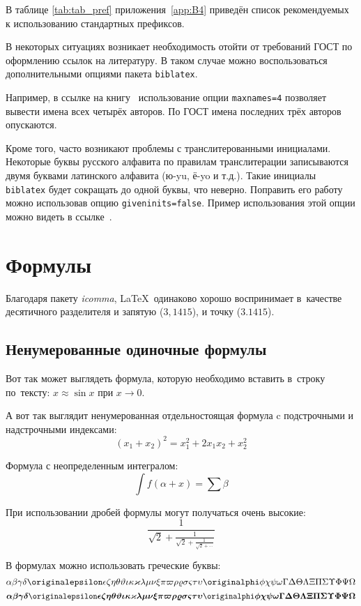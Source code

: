 В таблице \cref{tab:tab_pref} приложения~\cref{app:B4} приведён список рекомендуемых
к использованию стандартных префиксов.

В некоторых ситуациях возникает необходимость отойти от требований ГОСТ по оформлению ссылок на
литературу.
В таком случае можно воспользоваться дополнительными опциями пакета \verb+biblatex+.

Например, в ссылке на книгу~\cite{sobenin_kdv} использование опции \verb+maxnames=4+ позволяет
вывести имена всех четырёх авторов.
По ГОСТ имена последних трёх авторов опускаются.

Кроме того, часто возникают проблемы с транслитерованными инициалами. Некоторые буквы русского
алфавита по правилам транслитерации записываются двумя буквами латинского алфавита (ю-yu, ё-yo и
т.д.).
Такие инициалы \verb+biblatex+ будет сокращать до одной буквы, что неверно.
Поправить его работу можно использовав опцию \verb+giveninits=false+.
Пример использования этой опции можно видеть в ссылке~\cite{initials}.

\section{Формулы}\label{sec:ch1/sec3}

Благодаря пакету \textit{icomma}, \LaTeX~одинаково хорошо воспринимает
в~качестве десятичного разделителя и запятую (\(3,1415\)), и точку (\(3.1415\)).

\subsection{Ненумерованные одиночные формулы}\label{subsec:ch1/sec3/sub1}

Вот так может выглядеть формула, которую необходимо вставить в~строку
по~тексту: \(x \approx \sin x\) при \(x \to 0\).

А вот так выглядит ненумерованная отдельностоящая формула c подстрочными
и надстрочными индексами:
\[
    (x_1+x_2)^2 = x_1^2 + 2 x_1 x_2 + x_2^2
\]

Формула с неопределенным интегралом:
\[
    \int f(\alpha+x)=\sum\beta
\]

При использовании дробей формулы могут получаться очень высокие:
\[
    \frac{1}{\sqrt{2}+
        \displaystyle\frac{1}{\sqrt{2}+
            \displaystyle\frac{1}{\sqrt{2}+\cdots}}}
\]

В формулах можно использовать греческие буквы:
\[
    \alpha\beta\gamma\delta\originalepsilon\epsilon\zeta\eta\theta%
    \vartheta\iota\kappa\varkappa\lambda\mu\nu\xi\pi\varpi\rho\varrho%
    \sigma\varsigma\tau\upsilon\originalphi\phi\chi\psi\omega\Gamma\Delta%
    \Theta\Lambda\Xi\Pi\Sigma\Upsilon\Phi\Psi\Omega
\]
\[%
    \boldsymbol{\alpha\beta\gamma\delta\originalepsilon\epsilon\zeta\eta%
        \theta\vartheta\iota\kappa\varkappa\lambda\mu\nu\xi\pi\varpi\rho%
        \varrho\sigma\varsigma\tau\upsilon\originalphi\phi\chi\psi\omega\Gamma%
        \Delta\Theta\Lambda\Xi\Pi\Sigma\Upsilon\Phi\Psi\Omega}
\]

